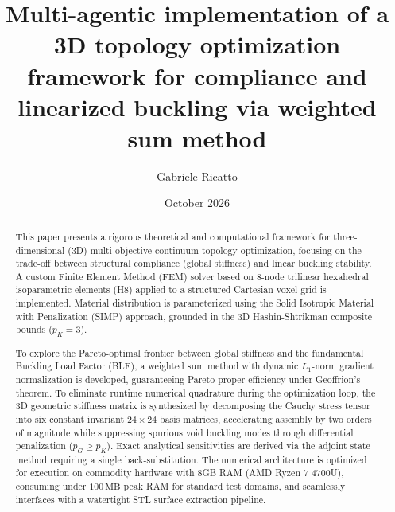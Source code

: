 \documentclass[11pt, a4paper]{article}
\title{\textbf{Multi-agentic implementation of a 3D topology optimization framework for compliance and linearized buckling via weighted sum method}}
\author{Gabriele Ricatto}
\date{October 2026}
\begin{document}
\maketitle

\begin{abstract}
This paper presents a rigorous theoretical and computational framework for three-dimensional (3D) multi-objective continuum topology optimization, focusing on the trade-off between structural compliance (global stiffness) and linear buckling stability. A custom Finite Element Method (FEM) solver based on 8-node trilinear hexahedral isoparametric elements (H8) applied to a structured Cartesian voxel grid is implemented. Material distribution is parameterized using the Solid Isotropic Material with Penalization (SIMP) approach, grounded in the 3D Hashin-Shtrikman composite bounds ($p_K = 3$). 

To explore the Pareto-optimal frontier between global stiffness and the fundamental Buckling Load Factor (BLF), a weighted sum method with dynamic $L_1$-norm gradient normalization is developed, guaranteeing Pareto-proper efficiency under Geoffrion's theorem. To eliminate runtime numerical quadrature during the optimization loop, the 3D geometric stiffness matrix is synthesized by decomposing the Cauchy stress tensor into six constant invariant $24 \times 24$ basis matrices, accelerating assembly by two orders of magnitude while suppressing spurious void buckling modes through differential penalization ($p_G \ge p_K$). Exact analytical sensitivities are derived via the adjoint state method requiring a single back-substitution. The numerical architecture is optimized for execution on commodity hardware with 8GB RAM (AMD Ryzen 7 4700U), consuming under $100\,\text{MB}$ peak RAM for standard test domains, and seamlessly interfaces with a watertight STL surface extraction pipeline.
\end{abstract}
\end{document}
